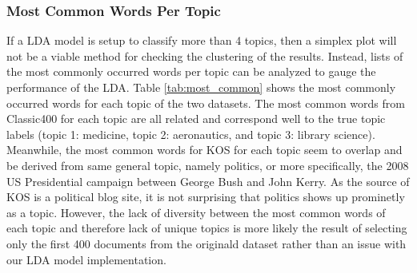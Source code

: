 \documentclass[10pt]{article}
\begin{document}
\subsubsection{Most Common Words Per Topic}
If a LDA model is setup to classify more than 4 topics, then a simplex plot will not be a viable method for checking the clustering of the results. Instead, lists of the most commonly occurred words per topic can be analyzed to gauge the performance of the LDA. Table \ref{tab:most_common} shows the most commonly occurred words for each topic of the two datasets. The most common words from Classic400 for each topic are all related and correspond well to the true topic labels (topic 1: medicine, topic 2: aeronautics, and topic 3: library science). Meanwhile, the most common words for KOS for each topic seem to overlap and be derived from same general topic, namely politics, or more specifically, the 2008 US Presidential campaign between George Bush and John Kerry. As the source of KOS is a political blog site, it is not surprising that politics shows up prominetly as a topic. However, the lack of diversity between the most common words of each topic and therefore lack of unique topics is more likely the result of selecting only the first 400 documents from the originald dataset rather than an issue with our LDA model implementation.
\end{document}
